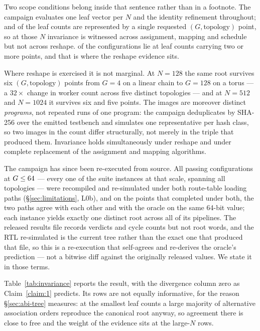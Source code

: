 \documentclass[journal,10pt]{IEEEtran}
\theoremstyle{plain}
\theoremstyle{definition}
\theoremstyle{remark}
\begin{document}
Two scope conditions belong inside that sentence rather than in a footnote.
The campaign evaluates one leaf vector per $N$ and the identity refinement
throughout; and \InvSingletonRows{} of the \InvLeafCounts{} leaf counts are
represented by a single requested $(G,\text{topology})$ point, so at those $N$
invariance is witnessed across assignment, mapping and schedule but not across
reshape. \InvMultiPoint{} of the \WallTBs{} configurations lie at leaf counts
carrying two or more points, and that is where the reshape evidence sits.

Where reshape is exercised it is not marginal. At $N{=}128$ the same root
survives six $(G,\text{topology})$ points from $G{=}4$ on a linear chain to
$G{=}128$ on a torus --- a $32\times$ change in worker count across five
distinct topologies --- and at $N{=}512$ and $N{=}1024$ it survives six and
five points. The \InvAttempted{} images are moreover distinct \emph{programs},
not repeated runs of one program: the campaign deduplicates by SHA-256 over
the emitted testbench and simulates one representative per hash class, so two
images in the count differ structurally, not merely in the triple that
produced them. Invariance holds simultaneously under reshape and under
complete replacement of the assignment and mapping algorithms.

The campaign has since been re-executed from source. All \RouteRuns{} passing
configurations at $G \le 64$ --- every one of the \RouteReexecInst{}
suite instances at that scale, spanning all \RouteTopoCount{} topologies ---
were recompiled and re-simulated under both route-table loading paths
(\S\ref{sec:limitations}, L0b), and on the \RouteReexec{} points that
completed under both, the two paths agree with each other and with the oracle
on the same 64-bit value; each instance yields exactly one distinct root
across all of its pipelines. The released results file records verdicts and
cycle counts but not root words, and the RTL re-simulated is the current tree
rather than the exact one that produced that file, so this is a re-execution
that self-agrees and re-derives the oracle's prediction --- not a bitwise diff
against the originally released values. We state it in those terms.

Table~\ref{tab:invariance} reports the result, with the divergence column zero
as Claim~\ref{claim:1} predicts. Its rows are not equally informative, for the
reason \S\ref{sec:abi-tree} measures: at the smallest leaf counts a large
majority of alternative association orders reproduce the canonical root
anyway, so agreement there is close to free and the weight of the evidence
sits at the large-$N$ rows.
\end{document}
